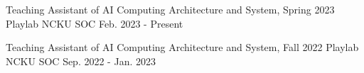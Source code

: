 

\begin{cventries}

  \cventry
  {Teaching Assistant of AI Computing Architecture and System, Spring 2023} %
  {Playlab} %
  {NCKU SOC} %
  {Feb. 2023 - Present} %
  {}

  \cventry
  {Teaching Assistant of AI Computing Architecture and System, Fall 2022}
  {Playlab}
  {NCKU SOC}
  {Sep. 2022 - Jan. 2023}
  {}

\end{cventries}

